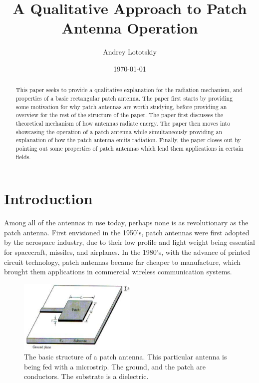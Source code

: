 \documentclass[12pt]{article}
\title{A Qualitative Approach to Patch Antenna Operation}
\author{Andrey Lototskiy}
\date{\today}
\begin{document}
\maketitle

\begin{abstract}
This paper seeks to provide a qualitative explanation for the radiation mechanism, and properties of a basic rectangular patch antenna. The paper first starts by providing some motivation for why patch antennas are worth studying, before providing an overview for the rest of the structure of the paper. The paper first discusses the theoretical mechanism of how antennas radiate energy. The paper then moves into showcasing the operation of a patch antenna while simultaneously providing an explanation of how the patch antenna emits radiation. Finally, the paper closes out by pointing out some properties of patch antennas which lend them applications in certain fields.
\end{abstract}

\section{Introduction}
Among all of the antennas in use today, perhaps none is as revolutionary as the patch antenna. First envisioned in the 1950's\cite{gutton1955flat}, patch antennas were first adopted by the aerospace industry\cite{balanis2016antenna}, due to their low profile and light weight being essential for spacecraft, missiles, and airplanes. In the 1980's, with the advance of printed circuit technology, patch antennas became far cheaper to manufacture\cite{khan2015microstrip}, which brought them applications in commercial wireless communication systems.  

\begin{figure}[h]
    \centering
    \includegraphics[width=0.5\textwidth]{patch-antenna-structure.png}
    \caption{The basic structure of a patch antenna. This particular antenna is being fed with a microstrip. The ground, and the patch are conductors. The substrate is a dielectric. \cite{girase2014design}}
\end{figure}
\end{document}
